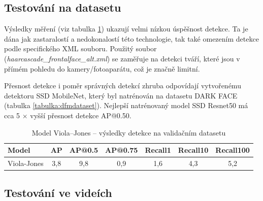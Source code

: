 \subsection*{Testování na datasetu}
Výsledky měření (viz tabulka \ref{tabulka:violajones}) ukazují velmi nízkou úspěšnost detekce. Ta je dána jak zastaralostí a nedokonalostí této technologie, tak také omezením detekce podle specifického XML souboru. Použitý soubor (\emph{haarcascade\_frontalface\_alt.xml}) se zaměřuje na detekci tváří, které jsou v přímém pohledu do kamery/fotoaparátu, což je značně limitní. 

Přesnost detekce i poměr správných detekcí zhruba odpovídají vytvořenému detektoru SSD MobileNet, který byl natrénován na datasetu DARK FACE (tabulka \ref{tabulka:dfmdataset}). Nejlepší natrénovaný model SSD Resnet50 má cca 5 $\times$ vyšší přesnost detekce AP@0.50.

\begin{table}[H]
  \begin{center}
    \begin{tabular}{|l|c|c|c|c|c|c|}
    \hline
    \rowcolor[HTML]{E0DBDB} 
    \textbf{Model}                      & \textbf{AP} & \textbf{AP@0.5} & \textbf{AP@0.75} & \textbf{Recall1} & \textbf{Recall10} & \textbf{Recall100} \\ \hline
    \cellcolor[HTML]{E0DBDB}Viola-Jones & 3,8         & 9,8             & 0,9              & 1,6              & 4,3               & 5,2                \\ \hline
    \end{tabular}
    \label{tabulka:violajones}
    \caption{Model Viola--Jones -- výsledky detekce na validačním datasetu}
  \end{center}
\end{table}

\subsection*{Testování ve videích}

